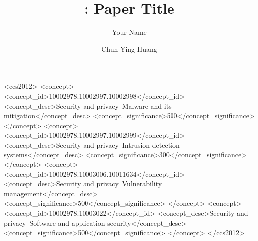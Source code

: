 \documentclass[acmlarge]{acmart}
\begin{document}
\title{\sys: Paper Title}

\iffalse
\author{Anonymous Authors}
\authornotemark[1]
\email{anonymous@institution.com}
\affiliation{%
  \institution{Anonymous Institution}
  \city{Anonymous City}
  \country{Anonymous Country}
}
\fi

\author{Your Name}
\authornotemark[1]

\author{Chun-Ying Huang}
\authornotemark[1]

\begin{CCSXML}
<ccs2012>
<concept>
<concept_id>10002978.10002997.10002998</concept_id>
<concept_desc>Security and privacy~Malware and its mitigation</concept_desc>
<concept_significance>500</concept_significance>
</concept>
<concept>
<concept_id>10002978.10002997.10002999</concept_id>
<concept_desc>Security and privacy~Intrusion detection systems</concept_desc>
<concept_significance>300</concept_significance>
</concept>
<concept>
<concept_id>10002978.10003006.10011634</concept_id>
<concept_desc>Security and privacy~Vulnerability management</concept_desc>
<concept_significance>500</concept_significance>
</concept>
<concept>
<concept_id>10002978.10003022</concept_id>
<concept_desc>Security and privacy~Software and application security</concept_desc>
<concept_significance>500</concept_significance>
</concept>
</ccs2012>
\end{CCSXML}


\begin{abstract}

\end{abstract}


\maketitle





\end{document}
